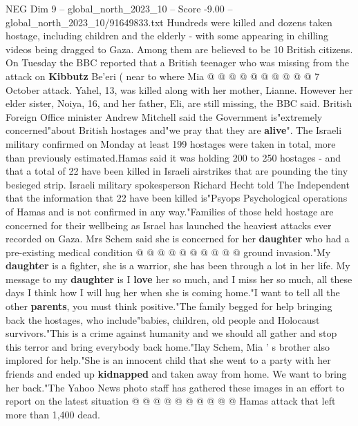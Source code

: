 \begin{textsample}{NEG Dim 9 – global\_north\_2023\_10 – Score -9.00 – global\_north\_2023\_10/91649833.txt}
Hundreds were killed and dozens taken hostage, including children and the elderly - with some appearing in chilling videos being dragged to Gaza.
Among them are believed to be 10 British citizens.
On Tuesday the BBC reported that a British teenager who was missing from the attack on \textbf{Kibbutz} Be'eri ( near to where Mia @ @ @ @ @ @ @ @ @ @ 7 October attack.
Yahel, 13, was killed along with her mother, Lianne.
However her elder sister, Noiya, 16, and her father, Eli, are still missing, the BBC said.
British Foreign Office minister Andrew Mitchell said the Government is"extremely concerned"about British hostages and"we pray that they are \textbf{alive}".
The Israeli military confirmed on Monday at least 199 hostages were taken in total, more than previously estimated.Hamas said it was holding 200 to 250 hostages - and that a total of 22 have been killed in Israeli airstrikes that are pounding the tiny besieged strip.
Israeli military spokesperson Richard Hecht told The Independent that the information that 22 have been killed is"Psyops Psychological operations of Hamas and is not confirmed in any way."Families of those held hostage are concerned for their wellbeing as Israel has launched the heaviest attacks ever recorded on Gaza.
Mrs Schem said she is concerned for her \textbf{daughter} who had a pre-existing medical condition @ @ @ @ @ @ @ @ @ @ ground invasion."My \textbf{daughter} is a fighter, she is a warrior, she has been through a lot in her life.
My message to my \textbf{daughter} is I \textbf{love} her so much, and I miss her so much, all these days I think how I will hug her when she is coming home."I want to tell all the other \textbf{parents}, you must think positive."The family begged for help bringing back the hostages, who include"babies, children, old people and Holocaust survivors."This is a crime against humanity and we should all gather and stop this terror and bring everybody back home."Ilay Schem, Mia ' s brother also implored for help."She is an innocent child that she went to a party with her friends and ended up \textbf{kidnapped} and taken away from home.
We want to bring her back."The Yahoo News photo staff has gathered these images in an effort to report on the latest situation @ @ @ @ @ @ @ @ @ @ Hamas attack that left more than 1,400 dead.

\end{textsample}
